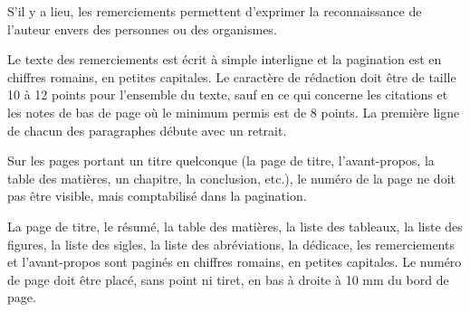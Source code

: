 \begin{ack}

S’il y a lieu, les remerciements permettent d’exprimer la reconnaissance de l’auteur envers des personnes ou des organismes.

Le texte des remerciements est écrit à simple interligne et la pagination est en chiffres romains, en petites capitales. Le caractère de rédaction doit être de taille 10 à 12 points pour l’ensemble du texte, sauf en ce qui concerne les citations et les notes de bas de page où le minimum permis est de 8 points. La première ligne de chacun des paragraphes débute avec un retrait.

Sur les pages portant un titre quelconque (la page de titre, l’avant-propos, la table des matières, un chapitre, la conclusion, etc.), le numéro de la page ne doit pas être visible, mais comptabilisé dans la pagination.

La page de titre, le résumé, la table des matières, la liste des tableaux, la liste des figures, la liste des sigles, la liste des abréviations, la dédicace, les remerciements et l’avant-propos sont paginés en chiffres romains, en petites capitales. Le numéro de page doit être placé, sans point ni tiret, en bas à droite à 10 mm du bord de page.

\end{ack}
